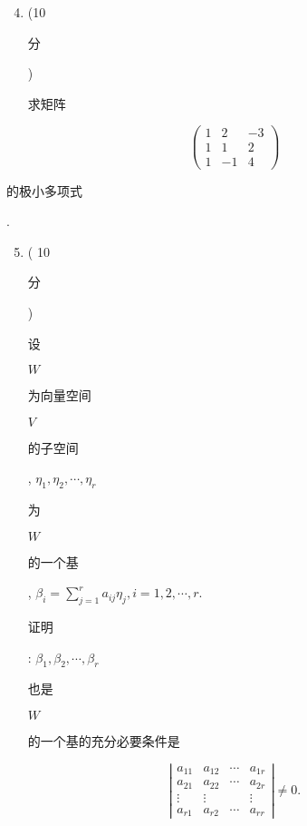 \documentclass[10pt]{article}
\begin{document}
\begin{enumerate}
  \setcounter{enumi}{3}
  \item (10 \begin{CJK}{UTF8}{mj}分\end{CJK}) \begin{CJK}{UTF8}{mj}求矩阵\end{CJK}
\end{enumerate}
$$
\left(\begin{array}{ccc}
1 & 2 & -3 \\
1 & 1 & 2 \\
1 & -1 & 4
\end{array}\right)
$$
\begin{CJK}{UTF8}{mj}的极小多项式\end{CJK}.

\begin{enumerate}
  \setcounter{enumi}{4}
  \item ( 10 \begin{CJK}{UTF8}{mj}分\end{CJK}) \begin{CJK}{UTF8}{mj}设\end{CJK} $W$ \begin{CJK}{UTF8}{mj}为向量空间\end{CJK} $V$ \begin{CJK}{UTF8}{mj}的子空间\end{CJK}, $\eta_{1}, \eta_{2}, \cdots, \eta_{r}$ \begin{CJK}{UTF8}{mj}为\end{CJK} $W$ \begin{CJK}{UTF8}{mj}的一个基\end{CJK}, $\beta_{i}=\sum_{j=1}^{r} a_{i j} \eta_{j}, i=1,2, \cdots, r$. \begin{CJK}{UTF8}{mj}证明\end{CJK}: $\beta_{1}, \beta_{2}, \cdots, \beta_{r}$ \begin{CJK}{UTF8}{mj}也是\end{CJK} $W$ \begin{CJK}{UTF8}{mj}的一个基的充分必要条件是\end{CJK}
\end{enumerate}
$$
\left|\begin{array}{cccc}
a_{11} & a_{12} & \cdots & a_{1 r} \\
a_{21} & a_{22} & \cdots & a_{2 r} \\
\vdots & \vdots & & \vdots \\
a_{r 1} & a_{r 2} & \cdots & a_{r r}
\end{array}\right| \neq 0 .
$$
\end{document}
